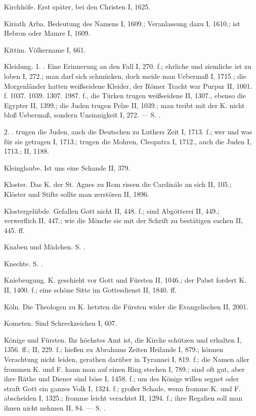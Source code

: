 Kirchhöfe. Erst später, bei den Christen I, 1625.

Kiriath Arba. Bedeutung des Namens I, 1609.; Veranlassung dazu I, 1610.; ist Hebron oder Mamre I, 1609.

Kittim. Völkername I, 661.

Kleidung. 1. . Eine Erinnerung an den Fall I, 270. f.; ehrliche und ziemliche ist zu loben I, 272.; man darf sich schmücken, doch meide man Uebermaß I, 1715.; die Morgenländer hatten weißseidene Kleider, der Römer Tracht war Purpur II, 1001. f. 1037. 1039. 1307. 1987. f., die Türken trugen weißseidene II, 1307., ebenso die Egypter II, 1399.; die Juden trugen Pelze II, 1039.; man treibt mit der K. nicht bloß Uebermaß, sondern Unsinnigkeit I, 272. — S. .

2. .  trugen die Juden, auch die Deutschen zu Luthers Zeit I, 1713. f.; wer und was für  sie getragen I, 1713.;  trugen die Mohren, Cleopatra I, 1712., auch die Juden I, 1713.;  II, 1188.

Kleinglaube. Ist uns eine Schande II, 379.

Kloster. Das K. der St. Agnes zu Rom rissen die Cardinäle an sich II, 105.; Klöster und Stifte sollte man zerstören II, 1896.

Klostergelübde. Gefallen Gott nicht II, 448. f.; sind Abgötterei II, 449.; verwerflich II, 447.; wie die Mönche sie mit der Schrift zu bestätigen suchen II, 445. ff.

Knaben und Mädchen. S. .

Knechte. S. .

Kniebeugung. K. geschieht vor Gott und Fürsten II, 1046.; der Pabst fordert K. II, 1400. f.; eine schöne Sitte im Gottesdienst II, 1840. ff.

Köln. Die Theologen zu K. hetzten die Fürsten wider die Evangelischen II, 2001.

Kometen. Sind Schreckzeichen I, 607.

Könige und Fürsten. Ihr höchstes Amt ist, die Kirche schützen und erhalten I, 1356. ff.; II, 229. f.; hießen zu Abrahams Zeiten Heilande I, 879.; können Verachtung nicht leiden, gerathen darüber in Tyrannei I, 819. f.; die Namen aller frommen K. und F. kann man auf einen Ring stechen I, 789.; sind oft gut, aber ihre Räthe und Diener sind böse I, 1458. f.; um des Königs willen segnet oder straft Gott ein ganzes Volk I, 1324. f.; großer Schade, wenn fromme K. und F. abscheiden I, 1325.; fromme leicht verachtet II, 1294. f.; ihre Regalien soll man ihnen nicht nehmen II, 84. — S. .

